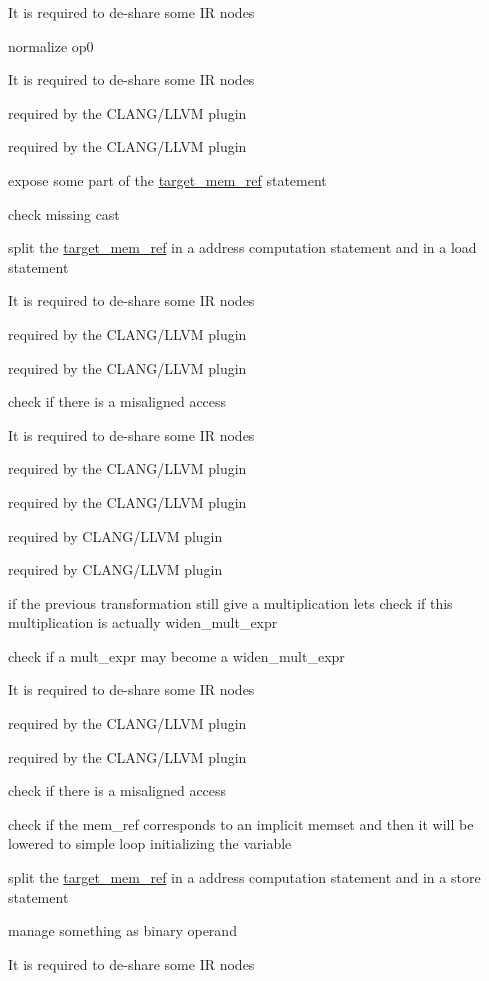 It is required to de-\/share some IR nodes

normalize op0

It is required to de-\/share some IR nodes

required by the C\+L\+A\+N\+G/\+L\+L\+VM plugin

required by the C\+L\+A\+N\+G/\+L\+L\+VM plugin

expose some part of the \hyperlink{structtarget__mem__ref}{target\+\_\+mem\+\_\+ref} statement

check missing cast

split the \hyperlink{structtarget__mem__ref}{target\+\_\+mem\+\_\+ref} in a address computation statement and in a load statement

It is required to de-\/share some IR nodes

required by the C\+L\+A\+N\+G/\+L\+L\+VM plugin

required by the C\+L\+A\+N\+G/\+L\+L\+VM plugin

check if there is a misaligned access

It is required to de-\/share some IR nodes

required by the C\+L\+A\+N\+G/\+L\+L\+VM plugin

required by the C\+L\+A\+N\+G/\+L\+L\+VM plugin

required by C\+L\+A\+N\+G/\+L\+L\+VM plugin

required by C\+L\+A\+N\+G/\+L\+L\+VM plugin

if the previous transformation still give a multiplication let\textquotesingle{}s check if this multiplication is actually widen\+\_\+mult\+\_\+expr

check if a mult\+\_\+expr may become a widen\+\_\+mult\+\_\+expr

It is required to de-\/share some IR nodes

required by the C\+L\+A\+N\+G/\+L\+L\+VM plugin

required by the C\+L\+A\+N\+G/\+L\+L\+VM plugin

check if there is a misaligned access

check if the mem\+\_\+ref corresponds to an implicit memset and then it will be lowered to simple loop initializing the variable

split the \hyperlink{structtarget__mem__ref}{target\+\_\+mem\+\_\+ref} in a address computation statement and in a store statement

manage something as binary operand

It is required to de-\/share some IR nodes

